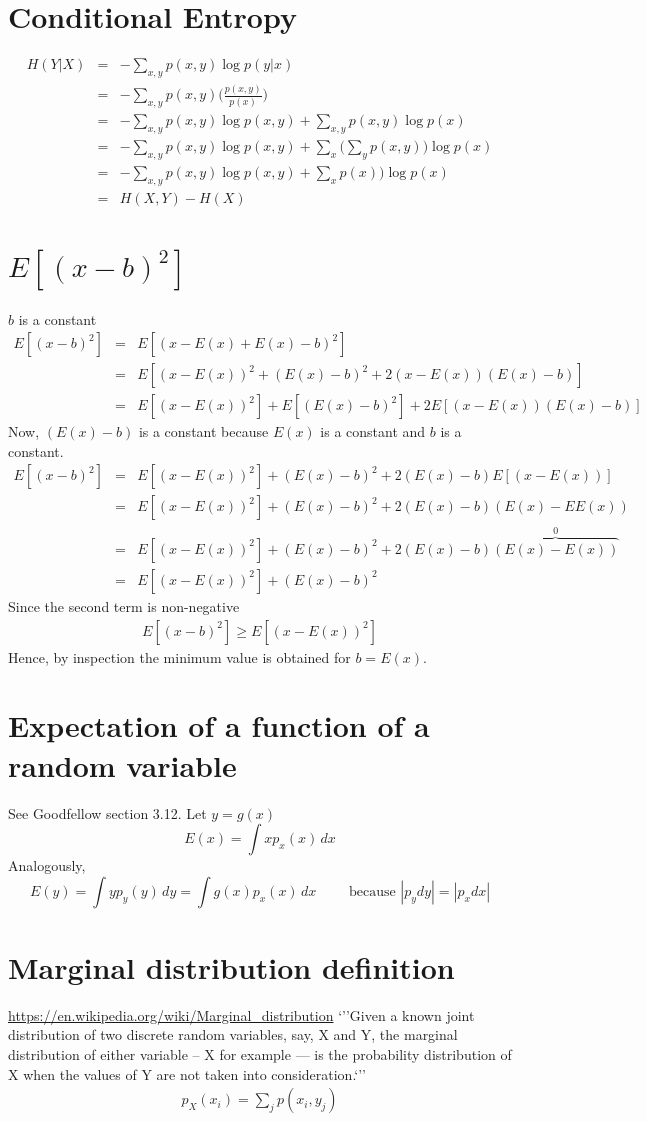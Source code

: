 \documentclass{article}
\newcommand{\beq}{\begin{equation}}
\newcommand{\eeq}{\end{equation}}
\newcommand{\ber}{\begin{eqnarray}}
\newcommand{\eer}{\end{eqnarray}}
\begin{document}
\section{Conditional Entropy}
\ber
H(Y|X) &=& -\sum_{x,y}p(x,y)\log{p(y|x)} \\
&=&  -\sum_{x,y}p(x,y)\Big(\frac{p(x,y)}{p(x)}\Big) \\
&=&  -\sum_{x,y}p(x,y)\log{p(x,y)} + \sum_{x,y}p(x,y)\log{p(x)} \\
&=& -\sum_{x,y}p(x,y)\log{p(x,y)} + \sum_{x}\Big(\sum_{y}p(x,y)\Big)\log{p(x)} \\
&=& -\sum_{x,y}p(x,y)\log{p(x,y)} + \sum_{x}p(x)\Big)\log{p(x)} \\
&=& H(X,Y)- H(X)
\eer
\section{$E[(x-b)^2]$}
$b$ is a constant 
\ber
E[(x-b)^2] &=& E[(x-E(x)+E(x)-b)^2] \\
&=& E[(x-E(x))^2 + (E(x)-b)^2 + 2(x-E(x))(E(x)-b)]\\
&=& E[(x-E(x))^2] + E[(E(x)-b)^2] + 2E[(x-E(x))(E(x)-b)]
\eer
Now, $(E(x)-b)$ is a constant because $E(x)$ is a constant and $b$ is a constant.
\ber
E[(x-b)^2] &=& E[(x-E(x))^2] + (E(x)-b)^2 + 2(E(x)-b)E[(x-E(x))] \\
&=& E[(x-E(x))^2] + (E(x)-b)^2 + 2(E(x)-b)(E(x)-EE(x)) \\
&=& E[(x-E(x))^2] + (E(x)-b)^2 + 2(E(x)-b)\overbrace{(E(x)-E(x))}^{0}\\
&=& E[(x-E(x))^2] + (E(x)-b)^2
\eer
Since the second term is non-negative
\ber
E[(x-b)^2]\ge E[(x-E(x))^2]
\eer
Hence, by inspection the minimum value is obtained for $b=E(x)$.
%
%
%
\section{Expectation of a function of a random variable}
See Goodfellow section 3.12. Let $y=g(x)$
\beq
E(x) = \int xp_x(x)\,dx
\eeq
Analogously,
\beq
E(y) = \int yp_y(y)\,dy = \int g(x) p_x(x)\,dx \qquad \text{ because } |p_ydy|=|p_xdx|
\eeq
%
%
%
\section{Marginal distribution definition}
\url{https://en.wikipedia.org/wiki/Marginal_distribution}
`''Given a known joint distribution of two discrete random variables, say, X and Y, the marginal distribution of either variable – X for example — is the probability distribution of X when the values of Y are not taken into consideration.`''
\ber
p_X(x_i) = \sum_{j}p(x_i,y_j)
\eer
%
%
%
\end{document}
